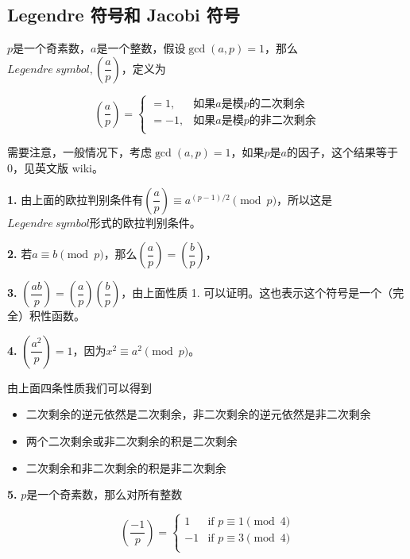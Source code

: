 \documentclass{article}
\begin{document}
\subsection{Legendre 符号和 Jacobi 符号}

\noindent $p$是一个奇素数，$a$是一个整数，假设$\gcd(a,p)=1$，那么$Legendre\ symbol, \left(\dfrac{a}{p}\right)$，定义为

\begin{equation}
    \left(\frac{a}{p}\right)=
    \begin{cases}
    =1,&\text{如果$a$是模$p$的二次剩余}\\
    =-1,&\text{如果$a$是模$p$的非二次剩余}\\        
    \end{cases}
\end{equation}

需要注意，一般情况下，考虑$\gcd(a,p)=1$，如果$p$是$a$的因子，这个结果等于0，见英文版 wiki。

\textbf{1.} 由上面的欧拉判别条件有$\left(\dfrac{a}{p}\right)\equiv a^{(p-1)/2}\pmod{p}$，所以这是$Legendre\ symbol$形式的欧拉判别条件。

\textbf{2.} 若$a\equiv b\pmod{p}$，那么$\left(\dfrac{a}{p}\right)=\left(\dfrac{b}{p}\right)$，

\textbf{3.} $\left(\dfrac{ab}{p}\right)=\left(\dfrac{a}{p}\right)\left(\dfrac{b}{p}\right)$，由上面性质 1. 可以证明。这也表示这个符号是一个（完全）积性函数。

\textbf{4.} $\left(\dfrac{a^2}{p}\right)=1$，$因为x^2\equiv a^2\pmod{p}$。

由上面四条性质我们可以得到

\begin{itemize}
    \item 二次剩余的逆元依然是二次剩余，非二次剩余的逆元依然是非二次剩余
    \item 两个二次剩余或非二次剩余的积是二次剩余
    \item 二次剩余和非二次剩余的积是非二次剩余
\end{itemize}

\textbf{5.} $p$是一个奇素数，那么对所有整数

\begin{equation}
    \left(\frac{-1}{p}\right)=
    \begin{cases}
        1&\text{if $p\equiv 1\pmod{4}$}\\
        -1&\text{if $p\equiv 3\pmod{4}$}\\
    \end{cases}
\end{equation}
\end{document}
